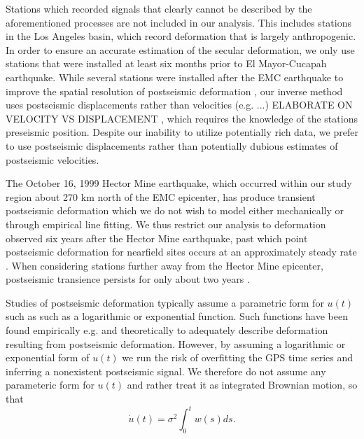 \documentclass[12pt]{article}
\begin{document}
Stations which recorded signals that clearly cannot be described by the aforementioned processes are not included in our analysis. This includes stations in the Los Angeles basin, which record deformation that is largely anthropogenic. In order to ensure an accurate estimation of the secular deformation, we only use stations that were installed at least six months prior to El Mayor-Cucapah earthquake. While several stations were installed after the EMC earthquake to improve the spatial resolution of postseismic deformation \citep{Spinler2015}, our inverse method uses postseismic displacements rather than velocities (e.g. ...)
ELABORATE ON VELOCITY VS DISPLACEMENT
, which requires the knowledge of the stations preseismic position. Despite our inability to utilize potentially rich data, we prefer to use postseismic displacements rather than potentially dubious estimates of postseismic velocities.

The October 16, 1999 Hector Mine earthquake, which occurred within our study region about 270 km north of the EMC epicenter, has produce transient postseismic deformation which we do not wish to model either mechanically or through empirical line fitting. We thus restrict our analysis to deformation observed six years after the Hector Mine earthquake, past which point postseismic deformation for nearfield sites occurs at an approximately steady rate \citep{Savage2009}. When considering stations further away from the Hector Mine epicenter, postseismic transience persists for only about two years \citep{Spinler2015}.

Studies of postseismic deformation typically assume a parametric form for $u(t)$ such as such as a logarithmic or exponential function. Such functions have been found empirically e.g. \citep{Savage2005a} and theoretically \citep{Marone1991} to adequately describe deformation resulting from postseismic deformation. However, by assuming a logarithmic or exponential form of $u(t)$ we run the risk of overfitting the GPS time series and inferring a nonexistent postseismic signal. We therefore do not assume any parameteric form for $u(t)$ and rather treat it as integrated Brownian motion, so that 
\begin{equation}
    \dot{u}(t) = \sigma^2\int_0^t w(s) ds.
\end{equation}    
\end{document}

